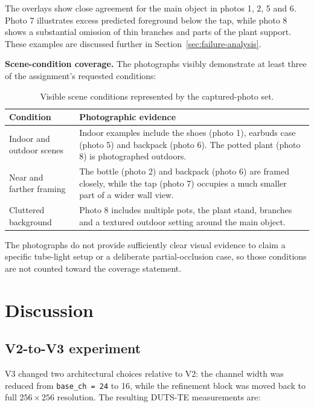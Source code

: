 \documentclass[10pt,a4paper]{article}
\newcommand{\code}[1]{\texttt{\small #1}}
\begin{document}
The overlays show close agreement for the main object in photos 1, 2, 5 and 6. Photo 7 illustrates excess predicted foreground below the tap, while photo 8 shows a substantial omission of thin branches and parts of the plant support. These examples are discussed further in Section~\ref{sec:failure-analysis}.

\textbf{Scene-condition coverage.} The photographs visibly demonstrate at least three of the assignment's requested conditions:

\begin{table}[H]
\vspace{-3pt}
\centering
\small
\caption{Visible scene conditions represented by the captured-photo set.}
\begin{tabularx}{\linewidth}{@{}l X@{}}
\toprule
\textbf{Condition} & \textbf{Photographic evidence}\\
\midrule
Indoor and outdoor scenes & Indoor examples include the shoes (photo 1), earbuds case (photo 5) and backpack (photo 6). The potted plant (photo 8) is photographed outdoors.\\
Near and farther framing & The bottle (photo 2) and backpack (photo 6) are framed closely, while the tap (photo 7) occupies a much smaller part of a wider wall view.\\
Cluttered background & Photo 8 includes multiple pots, the plant stand, branches and a textured outdoor setting around the main object.\\
\bottomrule
\end{tabularx}
\vspace{-3pt}
\end{table}

The photographs do not provide sufficiently clear visual evidence to claim a specific tube-light setup or a deliberate partial-occlusion case, so those conditions are not counted toward the coverage statement.

\clearpage
\section{Discussion}

\subsection{V2-to-V3 experiment}

V3 changed two architectural choices relative to V2: the channel width was reduced from \code{base\_ch = 24} to 16, while the refinement block was moved back to full $256\times256$ resolution. The resulting DUTS-TE measurements are:
\end{document}
